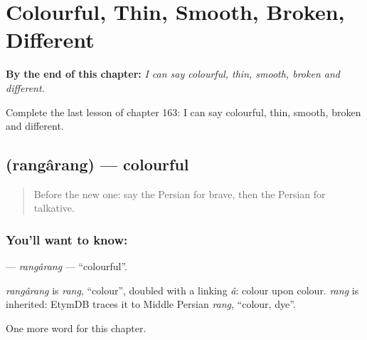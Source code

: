 
\chapter{Colourful, Thin, Smooth, Broken, Different}
\label{ch:fa-colourful-thin-smooth-broken-different}

\begin{chapteropening}
\textbf{By the end of this chapter:} \emph{I can say colourful, thin, smooth, broken and different.}

Complete the last lesson of chapter 163: I can say colourful, thin, smooth, broken and different.
\end{chapteropening}

\section[\texorpdfstring{\fa{رنگارنگ} (rangârang)}{رنگارنگ (rangârang)}]{ (rangârang) — colourful}

\label{lesson:FA-C163-rangarang}



\begin{quote}
Before the new one: say the Persian for brave, then the Persian for talkative.
\end{quote}

\subsection*{You'll want to know: }
\textbf{} — \emph{rangârang} — \textquotedblleft{}colourful\textquotedblright{}.

\begin{cousinweb}
\emph{rangârang} is \emph{rang}, \textquotedblleft{}colour\textquotedblright{}, doubled with a linking \emph{â}: colour upon colour. \emph{rang} is inherited: EtymDB traces it to Middle Persian \emph{rang}, \textquotedblleft{}colour, dye\textquotedblright{}.
\end{cousinweb}

\begin{grammarlens}[title={What you've built}]
One more word for this chapter.
\end{grammarlens}

